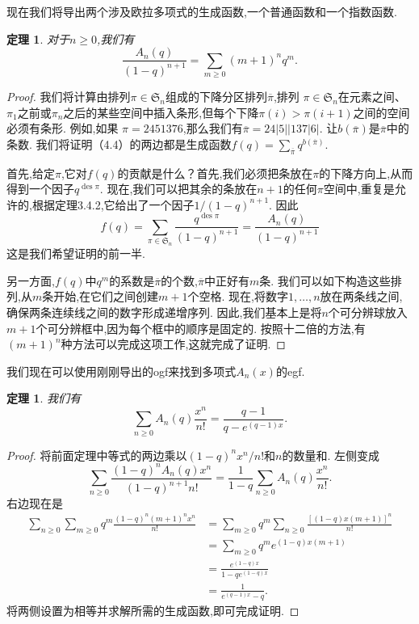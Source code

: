 \documentclass[a4paper,12pt]{ctexbook}
\newtheorem{theorem}[lemma]{\hspace{2em}定理}%
\begin{document}
现在我们将导出两个涉及欧拉多项式的生成函数,一个普通函数和一个指数函数.  
\begin{theorem}
	对于$n\ge 0$,我们有
	\begin{equation}
	\frac{A_{n}(q)}{(1-q)^{n+1}}=\sum_{m\geq 0}(m+1)^n q^m.  
	\end{equation}
\end{theorem}
\begin{proof}
	我们将计算由排列$\pi \in\mathfrak{S}_{n}$组成的{\kaishu 下降分区排列}$\overline{\pi}$,排列
	$\pi \in\mathfrak{S}_{n}$在元素之间、$\pi_1$之前或$\pi_n$之后的某些空间中插入条形,但每个下降$\pi(i)>\pi(i+1)$之间的空间必须有条形.  例如,如果
	$\pi= 2451376$,那么我们有$\overline{\pi}=24|5||137|6|$.  让$b(\overline{\pi})$是$\overline{\pi}$中的条数.  我们将证明（4.4）的两边都是生成函数$f(q)=\sum_{\overline{\pi}}q^{b(\overline{\pi})}$.  
	
	首先,给定$\pi $,它对$f(q)$的贡献是什么？首先,我们必须把条放在$\pi $的下降方向上,从而得到一个因子$q^{\operatorname{des}\pi}$.  现在,我们可以把其余的条放在$n+1$的任何$\pi $空间中,重复是允许的,根据定理3.4.2,它给出了一个因子${1}/{(1-q)^{n+1}}$. 因此
	$$f(q)=\sum_{\pi \in\mathfrak{S}_{n}}\frac{q^{\operatorname{des}\pi}}{(1-q)^{n+1}}=\frac{A_{n}(q)}{(1-q)^{n+1}}$$
	这是我们希望证明的前一半.  
	
	另一方面,$f(q)$中$q^m$的系数是$\overline{\pi}$的个数,$\overline{\pi}$中正好有$m$条.  我们可以如下构造这些排列,从$m$条开始,在它们之间创建$m+1$个空格.  现在,将数字$1,\dots,n$放在两条线之间,确保两条连续线之间的数字形成递增序列.  因此,我们基本上是将$n$个可分辨球放入$m+1$个可分辨框中,因为每个框中的顺序是固定的.  按照十二倍的方法,有$(m+1)^n$种方法可以完成这项工作,这就完成了证明.  
\end{proof}

我们现在可以使用刚刚导出的ogf来找到多项式$A_{n}(x)$的egf. 
\begin{theorem}
	我们有
	\begin{equation}
	\sum_{n\geq0}A_{n}(q)\frac{x^n}{n!}=\frac{q-1}{q-e^{(q-1)x}}. 
	\end{equation}
\end{theorem}
\begin{proof}
	将前面定理中等式的两边乘以$(1-q)^{n}x^n/n!$和$n$的数量和.  左侧变成
	$$\sum_{n\geq0}\frac{(1-q)^{n}A_{n}(q)x^n}{(1-q)^{n+1}n!}=\frac{1}{1-q}\sum_{n\geq0}A_{n}(q)\frac{x^n}{n!}. $$
	右边现在是
	\begin{align*}
	\sum_{n\geq0}\sum_{m\geq0}q^m\frac{(1-q)^{n}(m+1)^{n}x^n}{n!}
	&=\sum_{m\geq0}q^m\sum_{n\geq0}\frac{[(1-q)x(m+1)]^n}{n!}\\
	&=\sum_{m\geq0}q^m e^{(1-q)x(m+1)}\\
	&=\frac{e^{(1-q)x}}{1-qe^{(1-q)x}}\\
	&=\frac{1}{e^{(q-1)x}-q}. 
	\end{align*}
	将两侧设置为相等并求解所需的生成函数,即可完成证明.  
\end{proof}
\end{document}
